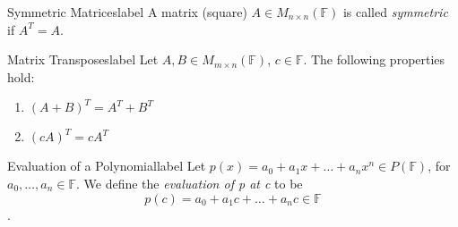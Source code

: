 \documentclass[12pt]{article}
\theoremstyle{definition}
\newcommand{\F}{\ensuremath{\mathbb{F}}}
\begin{document}
\begin{definition}{Symmetric Matrices}{label}
   A matrix (square) $A \in M_{n \times n}(\F)$ is called \emph{symmetric} if $A^T = A$.
\end{definition}
\begin{properties}{Matrix Transposes}{label}
   Let $A,B \in M_{m\times n}(\F)$, $c\in \F$. The following properties hold:
   \begin{enumerate}
       \item $(A + B)^T = A^T + B^T$
       \item $(cA)^T = cA^T$
   \end{enumerate}
\end{properties}
\begin{definition}{Evaluation of a Polynomial}{label}
    Let $p(x) = a_0 + a_1x + \dots + a_nx^n \in P(\F)$, for $a_0,\dots,a_n \in \F$. We define the \emph{evaluation of p at c} to be
    $$p(c) = a_0 + a_1c + \dots + a_nc \in \F$$.
    
\end{definition}
\end{document}
